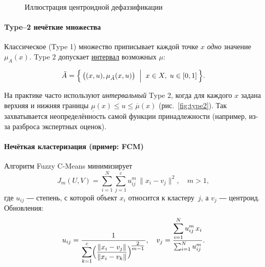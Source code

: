 \begin{figure}[h]
\centering
{}
\caption{Иллюстрация центроидной дефаззификации}
\label{fig:centroid}
\end{figure}

\paragraph{Type–2 нечёткие множества}

Классическое (Type 1) множество
приписывает каждой точке $x$ \emph{одно} значение $\mu_A(x)$.
Type 2 допускает \underline{интервал} возможных $\mu$:

\[
  \tilde A
  = \Bigl\{\,\bigl((x,u),\mu_{\tilde A}(x,u)\bigr)
     \;\Bigm|\;
     x\in X,\;u\in[0,1]\,\Bigr\}.
\]

На практике часто используют
\emph{интервальный} Type 2,
когда для каждого $x$ задана верхняя и нижняя границы
\(
  \underline\mu(x)\le u\le\overline\mu(x)
\)
(рис.~\ref{fig:type2}).  
Так захватывается неопределённость
самой функции принадлежности
(например, из-за разброса экспертных оценок).

\paragraph{Нечёткая кластеризация (пример: FCM)}

Алгоритм Fuzzy C-Means минимизирует
\begin{equation}
  J_m(U,V) =
  \sum_{i=1}^N \sum_{j=1}^c
    u_{ij}^m\,\lVert x_i - v_j\rVert^2,
  \quad m>1,
\end{equation}
где $u_{ij}$ ― степень,
с которой объект $x_i$ относится к кластеру~$j$,
а $v_j$ ― центроид.  
Обновления:
\[
  u_{ij}
  = \frac{1}{\displaystyle
      \sum_{k=1}^c
      \Bigl(\frac{\lVert x_i-v_j\rVert}{\lVert x_i-v_k\rVert}\Bigr)^{\!\tfrac{2}{m-1}}},
  \quad
  v_j
  = \frac{\displaystyle
      \sum_{i=1}^N u_{ij}^m\,x_i}{
      \sum_{i=1}^N u_{ij}^m}.
\]

